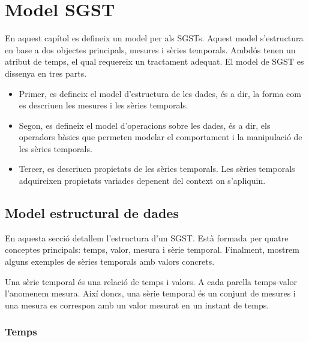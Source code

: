 
\chapter{Model SGST}
\label{cap:model:sgst}

En aquest capítol es defineix un model per als \glspl{SGST}. Aquest model
s'estructura en base a dos objectes principals, mesures i sèries temporals.
Ambdós tenen un atribut de temps, el qual requereix un tractament
adequat. El model de \gls{SGST} es dissenya en tres parts.

\begin{itemize}

\item Primer, es defineix el model d'estructura de les dades, és a
  dir, la forma com es descriuen les mesures i les sèries temporals.  

\item Segon, es defineix el model d'operacions sobre les dades, és a
  dir, els operadors bàsics que permeten modelar el comportament i la
  manipulació de les sèries temporals.

\item Tercer, es descriuen propietats de les sèries
  temporals. Les sèries temporals adquireixen propietats
  variades depenent del context on s'apliquin.

\end{itemize}





\section{Model estructural de dades}

En aquesta secció detallem l'estructura d'un \gls{SGST}. Està formada
per quatre conceptes principals: temps, valor, mesura i sèrie
temporal. Finalment, mostrem alguns exemples de sèries temporals amb valors
concrets.

Una sèrie temporal és una relació de temps i valors. A cada parella
temps-valor l'anomenem mesura. Així doncs, una sèrie temporal és un
conjunt de mesures i una mesura es correspon amb un valor mesurat en
un instant de temps.





\subsection{Temps}
\label{sec:sgst:temps}

